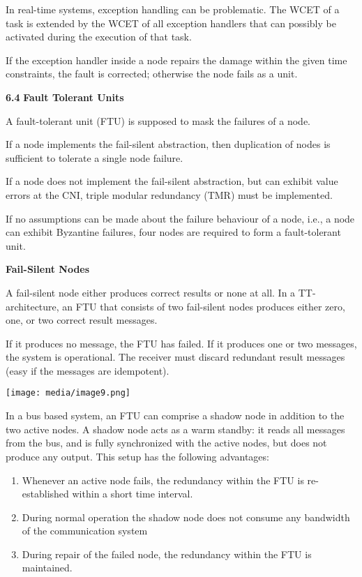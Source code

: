 In real-time systems, exception handling can be problematic. The WCET of
a task is extended by the WCET of all exception handlers that can
possibly be activated during the execution of that task.

If the exception handler inside a node repairs the damage within the
given time constraints, the fault is corrected; otherwise the node fails
as a unit.

\textbf{6.4} \protect\hypertarget{teil5}{}{}\textbf{Fault Tolerant
Units}

A fault-tolerant unit (FTU) is supposed to mask the failures of a node.

If a node implements the fail-silent abstraction, then duplication of
nodes is sufficient to tolerate a single node failure.

If a node does not implement the fail-silent abstraction, but can
exhibit value errors at the CNI, triple modular redundancy (TMR) must be
implemented.

If no assumptions can be made about the failure behaviour of a node,
i.e., a node can exhibit Byzantine failures, four nodes are required to
form a fault-tolerant unit.

\textbf{Fail-Silent Nodes}

A fail-silent node either produces correct results or none at all. In a
TT-architecture, an FTU that consists of two fail-silent nodes produces
either zero, one, or two correct result messages.

If it produces no message, the FTU has failed. If it produces one or two
messages, the system is operational. The receiver must discard redundant
result messages (easy if the messages are idempotent).

\texttt{[image: media/image9.png]}

In a bus based system, an FTU can comprise a shadow node in addition to
the two active nodes. A shadow node acts as a warm standby: it reads all
messages from the bus, and is fully synchronized with the active nodes,
but does not produce any output. This setup has the following
advantages:

\begin{enumerate}
\def\labelenumi{\arabic{enumi}.}
\item
  Whenever an active node fails, the redundancy within the FTU is
  re-established within a short time interval.
\item
  During normal operation the shadow node does not consume any bandwidth
  of the communication system
\item
  During repair of the failed node, the redundancy within the FTU is
  maintained.
\end{enumerate}

